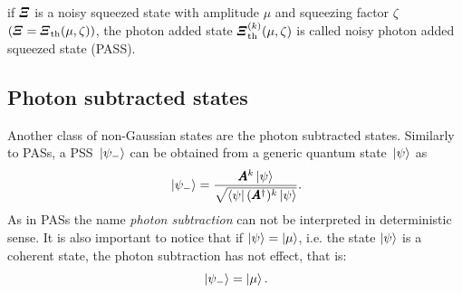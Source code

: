         if $\Operator{\varXi}$ is a noisy squeezed state with amplitude $\mu$ and squeezing factor 
        $\zeta$ $(\Operator{\varXi}=\Operator{\varXi}_{\mathrm{th}}(\mu,\zeta))$, the photon added state 
        $\Operator{\varXi}_{\mathrm{th}}^{(k)}(\mu,\zeta)$ is called noisy photon added squeezed state 
        (PASS).

    \subsection{Photon subtracted states}
        Another class of non-Gaussian states are the photon subtracted states. Similarly to PASs, a PSS 
        $\ket*{\psi_-}$ can be obtained from a generic quantum state $\ket*{\psi}$ as
        \begin{equation}
            \ket*{\psi_-} = \frac{\Operator{A}^k \ket{\psi}}{\sqrt{\bra{\psi}(\Operator{A}^\dagger)^k\ket{\psi}}}.
        \end{equation}
        As in PASs the name \emph{photon subtraction} can not be interpreted in deterministic sense.
        It is also important to notice that if $\ket{\psi}=\ket{\mu}$, i.e. the state $\ket{\psi}$ is 
        a coherent state, the photon subtraction has not effect, that is:
        \begin{equation*}
            \ket*{\psi_-}=\ket{\mu}.
        \end{equation*}